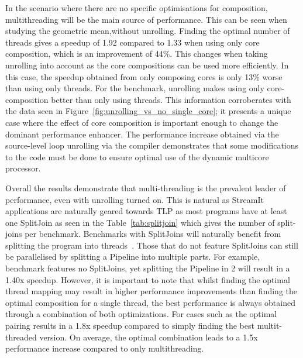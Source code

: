 In the scenario where there are no specific optimisations for composition, multithreading will be the main source of performance.
This can be seen when studying the geometric mean,without unrolling.
Finding the optimal number of threads gives a speedup of 1.92 compared to 1.33 when using only core composition, which is an improvement of 44\%.
This changes when taking unrolling into account as the core compositions can be used more efficiently.
In this case, the speedup obtained from only composing cores is only 13\% worse than using only threads.
For the  benchmark, unrolling makes using only core-composition better than only using threads.
This information corroberates with the data seen in Figure~\ref{fig:unrolling_vs_no_single_core}; it presents a unique case where the effect of core composition is important enough to change the dominant performance enhancer.
The performance increase obtained via the source-level loop unrolling via the compiler demonstrates that some modifications to the code must be done to ensure optimal use of the dynamic multicore processor.

Overall the results demonstrate that multi-threading is the prevalent leader of performance, even with unrolling turned on.
This is natural as StreamIt applications are naturally geared towards TLP as most programs have at least one SplitJoin as seen in the Table~\ref{tab:splitjoin} which gives the number of split-joins per benchmark.
Benchmarks with SplitJoins will naturally benefit from splitting the program into threads~\cite{thiesStreamit2010}.
Those that do not feature SplitJoins can still be parallelised by splitting a Pipeline into multiple parts.
For example, benchmark  features no SplitJoins, yet splitting the Pipeline in 2 will result in a 1.40x speedup.
However, it is important to note that whilst finding the optimal thread mapping may result in higher performance improvements than finding the optimal composition for a single thread, the best performance is always obtained through a combination of both optimizations.
For cases such as  the optimal pairing results in a 1.8x speedup compared to simply finding the best multit-threaded version.
On average, the optimal combination leads to a 1.5x performance increase compared to only multithreading.

